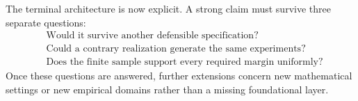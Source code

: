 The terminal architecture is now explicit. A strong claim must survive three
separate questions:
\[
\boxed{
\begin{aligned}
&\text{Would it survive another defensible specification?}\\
&\text{Could a contrary realization generate the same experiments?}\\
&\text{Does the finite sample support every required margin uniformly?}
\end{aligned}
}
\]
Once these questions are answered, further extensions concern new mathematical
settings or new empirical domains rather than a missing foundational layer.
